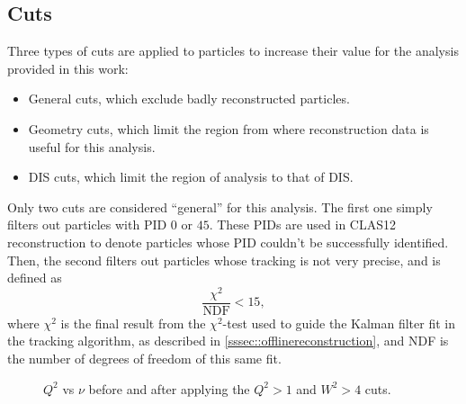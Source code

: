 \subsection{Cuts} \label{ssec::cuts}
    Three types of cuts are applied to particles to increase their value for the analysis provided in this work:
    \begin{itemize}
        \item
            General cuts, which exclude badly reconstructed particles.
        \item
            Geometry cuts, which limit the region from where reconstruction data is useful for this analysis.
        \item
            DIS cuts, which limit the region of analysis to that of DIS.
    \end{itemize}

    Only two cuts are considered ``general'' for this analysis.
    The first one simply filters out particles with PID $0$ or $45$.
    These PIDs are used in CLAS12 reconstruction to denote particles whose PID couldn't be successfully identified.
    Then, the second filters out particles whose tracking is not very precise, and is defined as
    \begin{equation*}
        \frac{\chi^2}{\text{NDF}} < 15,
    \end{equation*}
    where $\chi^2$ is the final result from the $\chi^2$-test used to guide the Kalman filter fit in the tracking algorithm, as described in \ref{sssec::offlinereconstruction}, and NDF is the number of degrees of freedom of this same fit.

    \begin{figure}[b!]
        \centering{}
        \caption[$Q^2$ vs $\nu$ comparison]{$Q^2$ vs $\nu$ before and after applying the $Q^2 > 1$ and $W^2 > 4$ cuts.}
        \label{fig::q2vsnu}
    \end{figure}

